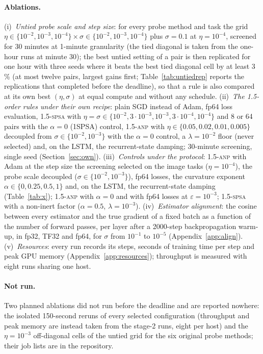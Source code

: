 \documentclass{article}
\newcommand{\method}[1]{\textsc{#1}}
\newcommand{\SPSAb}{\method{1.5-spsa}}
\newcommand{\ANPb}{\method{1.5-anp}}
\begin{document}
\paragraph{Ablations.}
(i)~\emph{Untied probe scale and step size}: for every probe method and task the
grid $\eta\in\{10^{-2},10^{-3},10^{-4}\}\times\sigma\in\{10^{-2},10^{-3},10^{-4}\}$ plus
$\sigma=0.1$ at $\eta=10^{-4}$, screened for 30 minutes at 1-minute granularity (the
tied diagonal is taken from the one-hour runs at minute 30); the best untied setting of
a pair is then replicated for one hour with three seeds where it beats the best tied
diagonal cell by at least 3\,\% (at most twelve pairs, largest gains first;
Table~\ref{tab:untiedrep} reports the replications that completed before the
deadline), so that a rule is also compared at its own best $(\eta,\sigma)$ at equal
compute and without any schedule.
(ii)~\emph{The 1.5-order rules under their own recipe}: plain SGD instead of Adam, fp64
loss evaluation, \SPSAb{} with $\eta=\sigma\in\{10^{-2},3\cdot10^{-3},10^{-3},3\cdot10^{-4},10^{-4}\}$
and 8 or 64 pairs with the $\alpha=0$ (1SPSA) control, \ANPb{} with
$\eta\in\{0.05,0.02,0.01,0.005\}$ decoupled from $\sigma\in\{10^{-2},10^{-3}\}$ with the
$\alpha=0$ control, a $\lambda=10^{-2}$ floor (never selected) and, on the LSTM, the
recurrent-state damping; 30-minute screening, single seed (Section~\ref{sec:own}). (iii)~\emph{Controls under the protocol}: \ANPb{} with
Adam at the step size the screening selected on the image tasks ($\eta=10^{-4}$), the
probe scale decoupled ($\sigma\in\{10^{-2},10^{-3}\}$), fp64 losses, the curvature
exponent $\alpha\in\{0,0.25,0.5,1\}$ and, on the LSTM, the recurrent-state damping
(Table~\ref{tab:x}); \ANPb{} with $\alpha=0$ and with fp64 losses at $\varepsilon=10^{-3}$;
\SPSAb{} with a non-inert factor ($\alpha=0.5$, $\lambda=10^{-3}$). (iv)~\emph{Estimator alignment}: the cosine between every estimator
and the true gradient of a fixed batch as a function of the number of forward passes,
per layer after a 2000-step backpropagation warm-up, in fp32, TF32 and fp64, for
$\sigma$ from $10^{-1}$ to $10^{-5}$ (Appendix~\ref{app:align}). (v)~\emph{Resources}: every run records its steps, seconds of training time per step
and peak GPU memory (Appendix~\ref{app:resources}); throughput is measured with eight
runs sharing one host.

\paragraph{Not run.}
Two planned ablations did not run before the deadline and are reported nowhere:
the isolated 150-second reruns of every selected configuration (throughput and peak
memory are instead taken from the stage-2 runs, eight per host) and the
$\eta=10^{-3}$ off-diagonal cells of the untied grid for the six original probe
methods; their job lists are in the repository.
\end{document}
